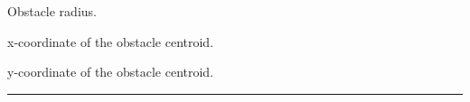 \documentclass[letterpaper,10pt,english]{sphinxmanual}
\begin{document}
\begin{fulllineitems}
\begin{fulllineitems}
\end{fulllineitems}


\begin{fulllineitems}
\label{Multi-robot motion planner:planning_sim.RoundObstacle.radius}
Obstacle radius.

\end{fulllineitems}


\begin{fulllineitems}
\label{Multi-robot motion planner:planning_sim.RoundObstacle.x}
x-coordinate of the obstacle centroid.

\end{fulllineitems}


\begin{fulllineitems}
\label{Multi-robot motion planner:planning_sim.RoundObstacle.y}
y-coordinate of the obstacle centroid.

\end{fulllineitems}


\end{fulllineitems}



\bigskip\hrule{}\bigskip

\end{document}
